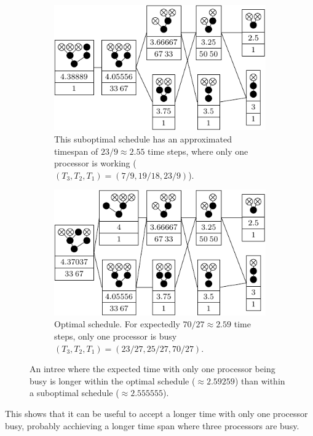 \begin{figure}[ht]
  \centering
  \begin{subfigure}{.45\linewidth}
    \centering
    \includegraphics{p3/keep_1_unbusy/one_unbusy_subopt.pdf}
    \caption{This suboptimal schedule has an approximated timespan of $23/9\approx 2.55$ time steps, where only one processor is working ($(T_3, T_2, T_1)=(7/9,19/18,23/9)$).}
  \end{subfigure}
  \quad
  \begin{subfigure}{.45\linewidth}
    \centering
    \includegraphics{p3/keep_1_unbusy/one_unbusy_opt.pdf}
    \caption{Optimal schedule. For expectedly $70/27\approx 2.59$ time steps, only one processor is busy $(T_3, T_2, T_1)=(23/27, 25/27, 70/27)$.}
  \end{subfigure}
  \caption{An intree where the expected time with only one processor being busy is longer within the optimal schedule ($\approx 2.59259$) than within a suboptimal schedule ($\approx 2.555555$).}
  \label{fig:p3-p1s-suboptimal-example}
\end{figure}

This shows that it can be useful to accept a longer time with only one processor busy, probably acchieving a longer time span where three processors are busy.

